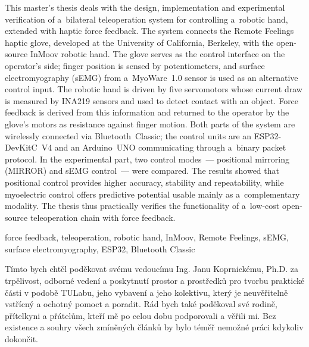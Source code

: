 \documentclass[FZS,DP]{tulthesis}
\begin{document}
\begin{abstractEN}
This master's thesis deals with the design, implementation and experimental
verification of a~bilateral teleoperation system for controlling a~robotic hand,
extended with haptic force feedback. The system connects the Remote Feelings
haptic glove, developed at the University of California, Berkeley, with the
open-source InMoov robotic hand. The glove serves as the control interface on
the operator's side; finger position is sensed by potentiometers, and surface
electromyography (sEMG) from a~MyoWare~1.0 sensor is used as an alternative
control input. The robotic hand is driven by five servomotors whose current
draw is measured by INA219 sensors and used to detect contact with an object.
Force feedback is derived from this information and returned to the operator by
the glove's motors as resistance against finger motion. Both parts of the
system are wirelessly connected via Bluetooth~Classic; the control units are an
ESP32-DevKitC~V4 and an Arduino~UNO communicating through a~binary packet
protocol. In the experimental part, two control modes~--- positional mirroring
(MIRROR) and sEMG control~--- were compared. The results showed that positional
control provides higher accuracy, stability and repeatability, while myoelectric
control offers predictive potential usable mainly as a~complementary modality.
The thesis thus practically verifies the functionality of a~low-cost open-source
teleoperation chain with force feedback.
\end{abstractEN}

\begin{keywordsEN}
force feedback, teleoperation, robotic hand, InMoov, Remote Feelings, sEMG, surface electromyography, ESP32, Bluetooth Classic
\end{keywordsEN}

\clearpage

\begin{acknowledgement}
Tímto bych chtěl poděkovat svému vedoucímu Ing. Janu Koprnickému, Ph.D. za trpělivost, odborné vedení a poskytnutí prostor a prostředků pro tvorbu praktické části v podobě TULabu, jeho vybavení a jeho kolektivu, který je neuvěřitelně vstřícný a ochotný pomoct a poradit. Rád bych také poděkoval své rodině, přítelkyni a přátelům, kteří mě po celou dobu podporovali a věřili mi. Bez existence a souhry všech zmíněných článků by bylo téměř nemožné práci kdykoliv dokončit.

\end{acknowledgement}
\end{document}
